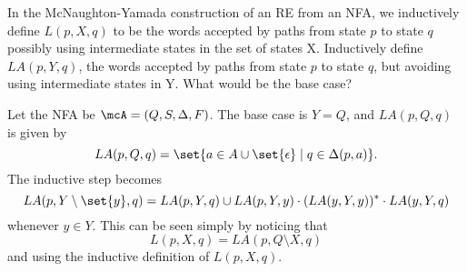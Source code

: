 \documentclass[12pt]{article}
\begin{document}
\begin{problem*}
    In the McNaughton-Yamada construction of an RE from an NFA,
    we inductively define $L(p, X, q)$ to be the words accepted by
    paths from state $p$ to state $q$ possibly using intermediate states
    in the set of states X.
    Inductively define $LA(p, Y, q)$,
    the words accepted by paths from state $p$ to state $q$,
    but avoiding using intermediate states in Y.
    What would be the base case? 
\end{problem*}
\begin{solution}
    Let the NFA be $\mcA = (Q, S, \Delta, F)$.
    The base case is $Y = Q$, and $LA(p, Q, q)$ is given by \[
        LA(p, Q, q) = \set{a \in A \cup \set{\epsilon}
            \mid q \in \Delta(p, a)}.
    \] The inductive step becomes \[
        LA(p, Y \setminus \set{y}, q)
        = LA(p, Y, q) \cup LA(p, Y, y) \cdot (LA(y, Y, y))^* \cdot LA(y, Y, q)
    \] whenever $y \in Y$.
    This can be seen simply by noticing that \[
        L(p, X, q) = LA(p, Q \setminus X, q)
    \] and using the inductive definition of $L(p, X, q)$.
\end{solution}
\end{document}
